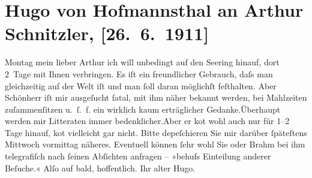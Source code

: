 

               \section[Hugo von Hofmannsthal an Arthur Schnitzler, {[}26. 6. 1911{]}]{ Hugo von Hofmannsthal an Arthur Schnitzler, {[}26. 6. 1911{]}}\nopagebreak{}\rehead{ }\begin{ledgroupsized}[t]{13cm}\normalsize\beginnumbering{} \toendnotes[C]{\smallbreak\pagebreak[2]} 
\pstart
           \raggedleft{}{\pb}Montag\pend
           \pstart{}mein lieber Arthur\pend\pstart
           ich will unbedingt auf den Se{\geminationm}ering hinauf, dort 2 Tage mit Ihnen verbringen. Es iſt ein
               freundlicher Gebrauch, daſs man gleichzeitig auf der Welt iſt und man ſoll daran
               möglichſt feſthalten.\pend
           \pstart
           Aber Schönherr iſt mir ausgeſucht fatal, mit ihm
               näher bekannt werden, bei Mahlzeiten {\pb}zuſammenſitzen u. ſ. f. ein
                  wirklich kaum erträglicher Gedanke.\hspace*{1.5em}Überhaupt werden mir Litteraten immer
                  bedenklicher.\hspace*{1.5em}Aber er ko{\geminationm}t wohl auch nur für 1–2 Tage hinauf, ko{\geminationm}t vielleicht gar nicht. Bitte depeſchieren Sie mir
               darüber ſpäteſtens Mittwoch vormittag näheres. Eventuell können ſehr
               wohl Sie oder Brahm bei ihm telegrafiſch nach
               ſeinen Abſichten anfragen – »behufs Einteilung anderer Beſuche.« \pend
           \pstart
           Alſo auf bald, hoffentlich. Ihr alter \spacefill\mbox{Hugo.}\pend
           \endnumbering{}\end{ledgroupsized}  \newcommand{\dateiname}{L02024}\newcommand{\titel}{Hugo von Hofmannsthal an Arthur Schnitzler, [26. 6. 1911]}\newcommand{\editorInnen}{Martin Anton Müller und Gerd-Hermann Susen}
      
